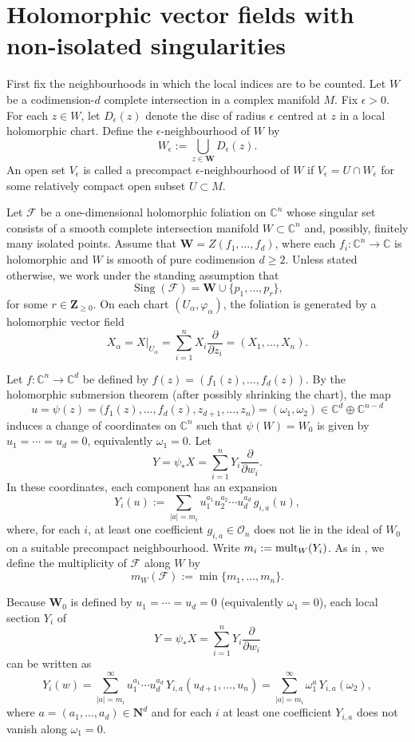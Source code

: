 \documentclass[10pt,twoside]{amsart}
\numberwithin{equation}{section}
\theoremstyle{definition}
\theoremstyle{remark}
\DeclareMathOperator{\sing}{Sing}
\newcommand{\C}{\mathbb{C}}
\newcommand{\F}{\mathcal{F}}
\newcommand{\oo}{\mathcal{O}}
\newcommand{\W}{\mathbf{W}}
\newcommand{\N}{\mathbf{N}}
\newcommand{\Z}{\mathbf{Z}}
\begin{document}
\section{Holomorphic vector fields with non-isolated singularities}
First fix the neighbourhoods in which the local indices are to be counted. Let $W$ be a codimension-$d$ complete intersection in a complex manifold $M$.
Fix $\epsilon>0$. For each $z\in W$, let $D_\epsilon(z)$ denote the disc of radius $\epsilon$ centred at $z$ in a local holomorphic chart.
Define the $\epsilon$-neighbourhood of $W$ by
\[
W_\epsilon:=\bigcup_{z\in \W} D_\epsilon(z).
\]
An open set $V_\epsilon$ is called a precompact $\epsilon$-neighbourhood of $W$ if $V_\epsilon=U\cap W_\epsilon$ for some relatively compact open subset $U\subset M$.

Let $\F$ be a one-dimensional holomorphic foliation on $\C^n$ whose singular set consists of a smooth complete intersection manifold
$W\subset \C^n$ and, possibly, finitely many isolated points.
Assume that $\W=Z(f_1,\ldots,f_d)$, where each $f_i:\C^n\to\C$ is holomorphic and $W$ is smooth of pure codimension $d\geq2$.
Unless stated otherwise, we work under the standing assumption that
\[
\sing(\F)=\W\cup\{p_1,\ldots,p_r\},
\]
for some $r\in \Z_{\geq 0}$.
On each chart $(U_\alpha,\varphi_\alpha)$, the foliation is generated by a holomorphic vector field
\[
X_{\alpha}=X|_{U_{\alpha}}=\sum_{i=1}^n X_i \frac{\partial}{\partial z_i}=(X_1,\ldots,X_n).
\]

Let $f:\C^n\to \C^d$ be defined by $f(z)=(f_1(z),\ldots,f_d(z))$.
By the holomorphic submersion theorem (after possibly shrinking the chart),
the map
\[
u=\psi(z)=\bigl(f_1(z),\ldots,f_d(z),z_{d+1},\ldots,z_n\bigr)=(\omega_1,\omega_2)\in \C^d\oplus \C^{n-d}
\]
induces a change of coordinates on $\C^n$ such that $\psi(W)=W_0$ is given by $u_1=\cdots=u_d=0$, equivalently $\omega_1=0$.
Let
\[
Y=\psi_*X=\sum_{i=1}^n Y_i \frac{\partial}{\partial w_i}.
\]
In these coordinates, each component has an expansion
\begin{equation}\label{multipli.pu}
Y_i(u):=\sum_{|a|=m_i} u_1^{a_1}u_2^{a_2}\cdots u_d^{a_d}\,g_{i,a}(u),
\end{equation}
where, for each $i$, at least one coefficient $g_{i,a}\in\oo_n$ does not lie in the ideal of $W_0$ on a suitable precompact neighbourhood.
Write $m_i:={\rm{mult}}_W(Y_i)$.
As in \cite{MAGR}, we define the multiplicity of $\F$ along $W$ by
\[
m_W(\F):=\min\{m_1,\ldots,m_n\}.
\]

Because $\W_0$ is defined by $u_1=\cdots=u_d=0$ (equivalently $\omega_1=0$), each local section $Y_i$ of
\[
Y=\psi_*X=\sum_{i=1}^n Y_i \frac{\partial}{\partial w_i}
\]
can be written as
\[
Y_i(w)=\sum_{|a|=m_i}^{\infty} u_1^{a_1}\cdots u_d^{a_d}\,Y_{i,a}(u_{d+1},\ldots,u_n)
=\sum_{|a|=m_i}^{\infty} \omega_1^{a}\,Y_{i,a}(\omega_2),
\]
where $a=(a_1,\ldots,a_d)\in \N^d$ and for each $i$ at least one coefficient $Y_{i,a}$ does not vanish along $\omega_1=0$.
\end{document}
